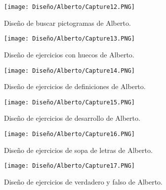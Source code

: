 \begin{figure}[ht!]
  \centering
\texttt{[image: Diseño/Alberto/Capture12.PNG]}
  \caption{Diseño de buscar pictogramas de Alberto.}
  
  
\end{figure}
\begin{figure}[ht!]
  \centering
\texttt{[image: Diseño/Alberto/Capture13.PNG]}
  \caption{Diseño de ejercicios con huecos de Alberto.}
  
  
\end{figure}
\begin{figure}[ht!]
  \centering
\texttt{[image: Diseño/Alberto/Capture14.PNG]}
  \caption{Diseño de ejercicios de definiciones de Alberto.}
  
  
\end{figure}
\begin{figure}[ht!]
  \centering
\texttt{[image: Diseño/Alberto/Capture15.PNG]}
  \caption{Diseño de ejercicios de desarrollo de Alberto.}
  
 
\end{figure}
\begin{figure}[ht!]
  \centering
\texttt{[image: Diseño/Alberto/Capture16.PNG]}
  \caption{Diseño de ejercicios de sopa de letras de Alberto.}
  
  
\end{figure}
\begin{figure}[ht!]
  \centering
\texttt{[image: Diseño/Alberto/Capture17.PNG]}
  \caption{Diseño de ejercicios de verdadero y falso de Alberto.}
  
 
\end{figure}
















































